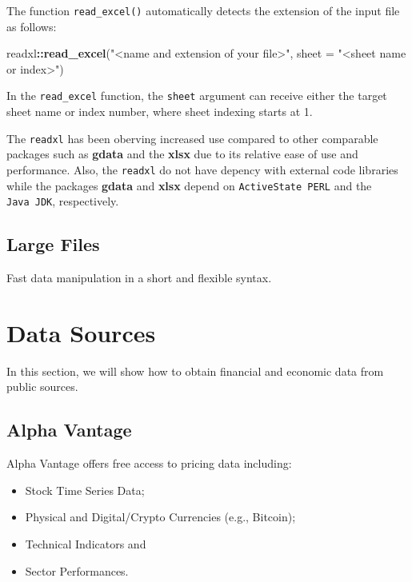 \documentclass[]{book}
\newenvironment{Shaded}{\begin{snugshade}}{\end{snugshade}}
\newcommand{\KeywordTok}[1]{\textcolor[rgb]{0.13,0.29,0.53}{\textbf{#1}}}
\newcommand{\DataTypeTok}[1]{\textcolor[rgb]{0.13,0.29,0.53}{#1}}
\newcommand{\StringTok}[1]{\textcolor[rgb]{0.31,0.60,0.02}{#1}}
\newcommand{\OperatorTok}[1]{\textcolor[rgb]{0.81,0.36,0.00}{\textbf{#1}}}
\newcommand{\NormalTok}[1]{#1}
\providecommand{\tightlist}{%
  \setlength{\itemsep}{0pt}\setlength{\parskip}{0pt}}
\theoremstyle{definition}
\theoremstyle{definition}
\theoremstyle{definition}
\theoremstyle{remark}
\begin{document}
The function \texttt{read\_excel()} automatically detects the extension
of the input file as follows:

\begin{Shaded}
\begin{Highlighting}[]
\NormalTok{readxl}\OperatorTok{::}\KeywordTok{read_excel}\NormalTok{(}\StringTok{"<name and extension of your file>"}\NormalTok{, }\DataTypeTok{sheet =} \StringTok{"<sheet name or index>"}\NormalTok{)}
\end{Highlighting}
\end{Shaded}

In the \texttt{read\_excel} function, the \texttt{sheet} argument can
receive either the target sheet name or index number, where sheet
indexing starts at 1.

The \texttt{readxl} has been oberving increased use compared to other
comparable packages such as \textbf{gdata} and the \textbf{xlsx} due to
its relative ease of use and performance. Also, the \texttt{readxl} do
not have depency with external code libraries while the packages
\textbf{gdata} and \textbf{xlsx} depend on \texttt{ActiveState\ PERL}
and the \texttt{Java\ JDK}, respectively.

\subsection{Large Files}\label{large-files}

Fast data manipulation in a short and flexible syntax.

\section{Data Sources}\label{data-sources}

In this section, we will show how to obtain financial and economic data
from public sources.

\subsection{Alpha Vantage}\label{alpha-vantage}

Alpha Vantage offers free access to pricing data including:

\begin{itemize}
\tightlist
\item
  Stock Time Series Data;
\item
  Physical and Digital/Crypto Currencies (e.g., Bitcoin);
\item
  Technical Indicators and
\item
  Sector Performances.
\end{itemize}
\end{document}
